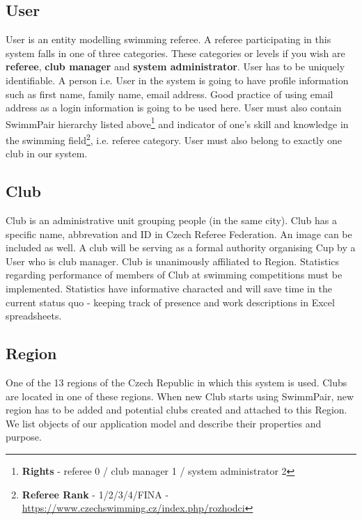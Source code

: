 \subsection*{User}
\par
User is an entity modelling swimming referee. A referee participating in this system falls in one of three categories. These categories or levels if you wish are \textbf{referee}, \textbf{club manager} and \textbf{system administrator}. User has to be uniquely identifiable. A person i.e. User in the system is going to have profile information such as first name, family name, email address. Good practice of using email address as a login information is going to be used here. User must also contain SwimmPair hierarchy listed above\footnote{\textbf{Rights} - referee 0 / club manager 1 / system administrator 2} and indicator of one's skill and knowledge in the swimming field\footnote{\textbf{Referee Rank} - 1/2/3/4/FINA - \url{https://www.czechswimming.cz/index.php/rozhodci}}, i.e. referee category. User must also belong to exactly one club in our system.
\subsection*{Club}
\par
Club is an administrative unit grouping people (in the same city). Club has a specific name, abbrevation and ID in Czech Referee Federation. An image can be included as well. A club will be serving as a formal authority organising Cup by a User who is club manager. Club is unanimously affiliated to Region. Statistics regarding performance of members of Club at swimming competitions must be implemented. Statistics have informative characted and will save time in the current status quo - keeping track of presence and work descriptions in Excel spreadsheets.
\subsection*{Region}
One of the 13 regions of the Czech Republic in which this system is used. Clubs are located in one of these regions. When new Club starts using SwimmPair, new region has to be added and potential clubs created and attached to this Region. 
We list objects of our application model and describe their properties and purpose. 
